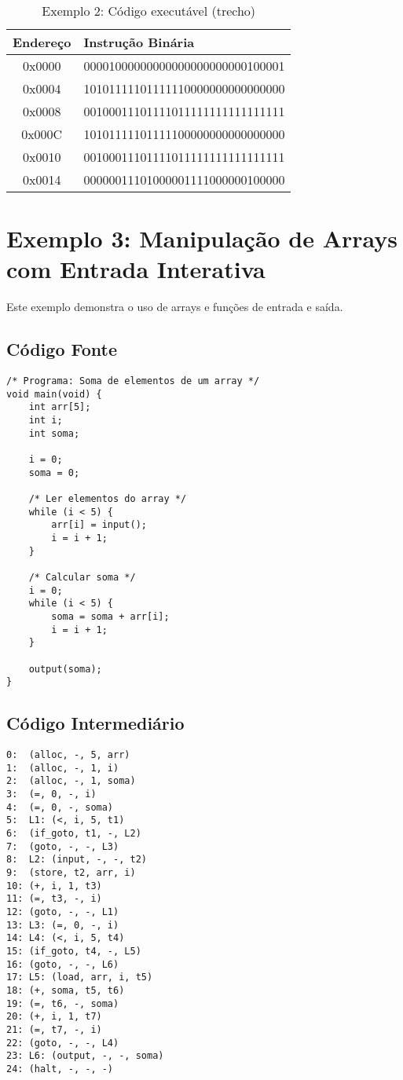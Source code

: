 \documentclass[
	12pt,				%
	oneside,
	a4paper,			%
	english,			%
	french,				%
	spanish,			%
	brazil,				%
	]{abntex2}
\begin{document}
\begin{table}[H]
\centering
\caption{Exemplo 2: Código executável (trecho)}
\begin{tabular}{|c|l|}
\hline
\textbf{Endereço} & \textbf{Instrução Binária} \\
\hline
0x0000 & 00001000000000000000000000100001 \\
\hline
0x0004 & 10101111101111110000000000000000 \\
\hline
0x0008 & 00100011101111011111111111111111 \\
\hline
0x000C & 10101111101111100000000000000000 \\
\hline
0x0010 & 00100011101111011111111111111111 \\
\hline
0x0014 & 00000011101000001111000000100000 \\
\hline
\end{tabular}
\end{table}

\section{Exemplo 3: Manipulação de Arrays com Entrada Interativa}

Este exemplo demonstra o uso de arrays e funções de entrada e saída.

\subsection{Código Fonte}

\begin{lstlisting}[style=cstyle, caption=Exemplo 3: Código fonte C-]
/* Programa: Soma de elementos de um array */
void main(void) {
    int arr[5];
    int i;
    int soma;
    
    i = 0;
    soma = 0;
    
    /* Ler elementos do array */
    while (i < 5) {
        arr[i] = input();
        i = i + 1;
    }
    
    /* Calcular soma */
    i = 0;
    while (i < 5) {
        soma = soma + arr[i];
        i = i + 1;
    }
    
    output(soma);
}
\end{lstlisting}

\subsection{Código Intermediário}

\begin{lstlisting}[style=cstyle, caption=Exemplo 3: Código intermediário (quádruplas)]
0:  (alloc, -, 5, arr)
1:  (alloc, -, 1, i)
2:  (alloc, -, 1, soma)
3:  (=, 0, -, i)
4:  (=, 0, -, soma)
5:  L1: (<, i, 5, t1)
6:  (if_goto, t1, -, L2)
7:  (goto, -, -, L3)
8:  L2: (input, -, -, t2)
9:  (store, t2, arr, i)
10: (+, i, 1, t3)
11: (=, t3, -, i)
12: (goto, -, -, L1)
13: L3: (=, 0, -, i)
14: L4: (<, i, 5, t4)
15: (if_goto, t4, -, L5)
16: (goto, -, -, L6)
17: L5: (load, arr, i, t5)
18: (+, soma, t5, t6)
19: (=, t6, -, soma)
20: (+, i, 1, t7)
21: (=, t7, -, i)
22: (goto, -, -, L4)
23: L6: (output, -, -, soma)
24: (halt, -, -, -)
\end{lstlisting}
\end{document}
